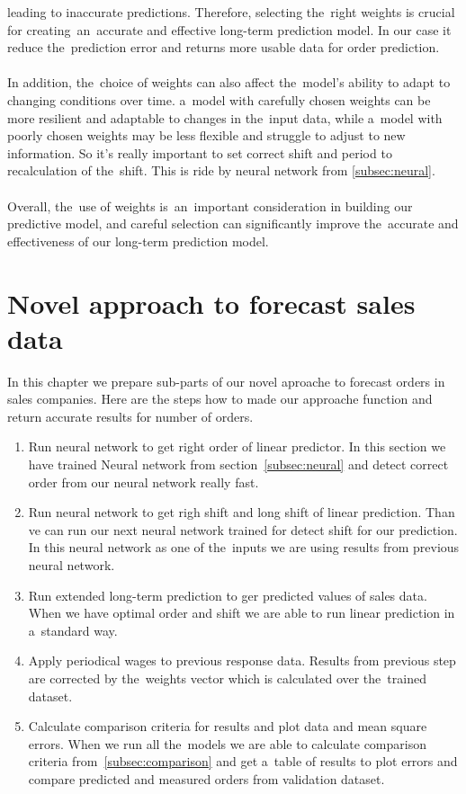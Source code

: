     leading to inaccurate predictions. Therefore, selecting the~right weights is crucial for creating~an~accurate and
    effective long-term prediction model. In our case it reduce the~prediction error and returns more usable
    data for order prediction.\\
    \\
    In addition, the~choice of weights can also affect the~model's ability to adapt to changing conditions over time.
    a~model with carefully chosen weights can be more resilient and adaptable to changes in the~input data,
    while a~model with poorly chosen weights may be less flexible and struggle to adjust to new information.
    So it's really important to set correct shift and period to recalculation of the~shift.
    This is ride by neural network from \ref{subsec:neural}.\\
    \\
    Overall, the~use of weights is~an~important consideration in building our predictive model, and careful selection
    can significantly improve the~accurate and effectiveness of our long-term prediction model.
    \section{Novel approach to forecast sales data}\label{subsec:combining_models}
    In this chapter we prepare sub-parts of our novel aproache to forecast orders in sales companies.
    Here are the steps how to made our approache function and return accurate results for number of orders.
    \begin{enumerate}
        \item Run neural network to get right order of linear predictor. In this section we have trained Neural network from section~\ref{subsec:neural} and detect correct order from our neural network really fast.
        \item Run neural network to get righ shift and long shift of linear prediction.
        Than ve can run our next neural network trained for detect shift for our prediction. In this neural network as one of the~inputs we are using results from previous neural network.
        \item Run extended long-term prediction to ger predicted values of sales data.
        When we have optimal order and shift we are able to run linear prediction in a~standard way.
        \item Apply periodical wages to previous response data.
        Results from previous step are corrected by the~weights vector which is calculated over the~trained dataset.
        \item Calculate comparison criteria for results and plot data and mean square errors.
        When we run all the~models we are able to calculate comparison criteria from~\ref{subsec:comparison} and
        get a~table of results to plot errors and compare predicted and measured orders from validation dataset.
    \end{enumerate}
